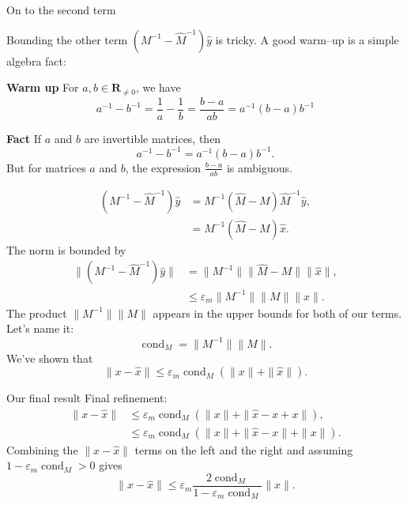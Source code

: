 \documentclass[usenames,dvipsnames,fleqn]{beamer}
\newcommand{\reals}{\mathbf{R}}
\DeclareMathOperator{\cond}{cond}
\theoremstyle{definition}
\begin{document}
\begin{frame}{On to the second term}

Bounding the other term \( \left(M^{-1} - \widehat M^{-1} \right) \widehat y \) is tricky. A good warm--up 
is a simple algebra fact:

\textbf{Warm up}  For \(a,b \in \reals_{\neq 0}\), we have
\[
   a^{-1} - b^{-1} = \frac{1}{a} - \frac{1}{b} = \frac{b-a}{a b} = a^{-1} (b - a) b^{-1}
\]


\textbf{Fact} If \(a\) and \(b\) are invertible matrices, then
\[
    a^{-1} - b^{-1} = a^{-1} (b - a) b^{-1}.
\]
But for matrices \(a\) and \(b\), the expression  \(\frac{b-a}{a b}\) is ambiguous.


\end{frame}
\begin{frame}
 \begin{align*}
    \left(M^{-1} - \widehat M^{-1} \right) \widehat y &= M^{-1} (\widehat M - M) \widehat M^{-1} \widehat y, \\
    &=   M^{-1} (\widehat M - M) \widehat x.
 \end{align*}
 The norm is bounded by
 \begin{align*}
  \| \left(M^{-1} - \widehat M^{-1} \right) \widehat y \| &= \| M^{-1} \| 
     \|  \widehat M - M \| \|\widehat x \|, \\
     &\leq  \varepsilon_m  \| M^{-1} \|  \| M \|  \|\widehat x \|.
 \end{align*} 
 The product  \(\| M^{-1} \|  \| M \| \) appears in the upper bounds for both of our terms. Let's name it:
 \[
    \cond_M = \| M^{-1} \|  \| M \|.
 \]
 We've shown that 
 \[
    \| x - \widehat x \| \leq \varepsilon_m \cond_M \left (\| x \| + \| \widehat x \| \right).
 \]
\end{frame}
\begin{frame}{Our final result}
Final refinement:
\begin{align*} 
    \| x - \widehat x \| & \leq \varepsilon_m \cond_M \left (\| x \| + \| \widehat x - x + x \| \right), \\
                &\leq  \varepsilon_m \cond_M \left (\| x \| + \| \widehat x - x  \| + \| x \| \right).
 \end{align*}
 Combining the \(\| x - \widehat x \| \) terms on the left and the right and assuming 
 \(1 - \varepsilon_m \cond_M   > 0 \) gives
 \[
     \| x - \widehat x \| \leq \varepsilon_m \frac{2 \cond_M}{1 - \varepsilon_m \cond_M } \| x \| .
 \]
\end{frame}
\end{document}
